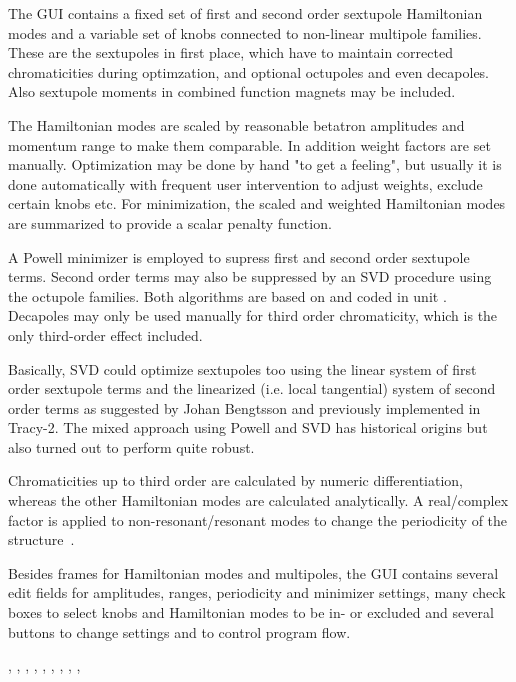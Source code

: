 \documentclass[12pt]{article}
\newcommand\code[1]{{\tt #1}}
\newcommand{\opagui}[1]{\colorbox{blue!20}{{\color{black}\code{#1}}}}
\newcommand{\ogui}[1]{\hyperref[#1]{\opagui{#1}}}
\newcommand{\opaguif}[1]{\colorbox{violet!30}{{\color{black}\code{#1}}}}
\newcommand{\oguif}[1]{\hyperref[#1]{\opaguif{#1}}}
\newcommand{\opauni}[1]{\colorbox{orange!30}{{\color{black}\code{#1}}}}
\newcommand{\ouni}[1]{\hyperref[#1]{\opauni{#1}}}
\newcommand{\uses}[1]{\flushleft {\bf Uses:} #1}
\newcommand{\desc}[1]{#1}
\newcommand{\todo}[1]{{\color{red} #1}}
\begin{document}
\desc{
The GUI contains a fixed set of first and second order sextupole Hamiltonian modes and a variable set of knobs connected to non-linear multipole families. These are the sextupoles in first place, which have to maintain corrected chromaticities during optimzation, and optional octupoles and even decapoles. Also sextupole moments in combined function magnets may be included. 

The Hamiltonian modes are scaled by reasonable  betatron amplitudes and momentum range to make them comparable. In addition weight factors are set manually. Optimization may be done by hand "to get a feeling", but usually it is done automatically with frequent user intervention to adjust weights, exclude certain knobs etc. For minimization, the scaled and weighted Hamiltonian modes are summarized to provide a scalar penalty function.

A Powell minimizer is employed to supress first and second order sextupole terms. Second order terms may also be suppressed by an SVD procedure using the octupole families. Both algorithms are based on \cite{numrec} and coded in unit \ouni{mathlib}. Decapoles may only be used manually for third order chromaticity, which is the only third-order effect included.

\todo{Basically, SVD could optimize sextupoles too using the linear system of first order sextupole terms and the linearized (i.e. local tangential) system of second order terms as suggested by Johan Bengtsson and previously implemented in Tracy-2. The mixed approach using Powell and SVD has historical origins but also turned out to perform quite robust.}

Chromaticities up to third order are calculated by numeric differentiation, whereas the other Hamiltonian modes are calculated analytically. A real/complex factor is applied to non-resonant/resonant modes to change the periodicity of the structure~\cite{inside}. 

Besides frames for Hamiltonian modes and multipoles, the GUI contains several edit fields for amplitudes, ranges, periodicity and minimizer settings, many check boxes to select knobs and Hamiltonian modes to be in- or excluded and several buttons to change settings and to control program flow.
}


\uses{
\oguif{chamframe}, \oguif{csexframe}, \ouni{chromreslib}, \ouni{chromelelib},  \ouni{chromlib}, \ogui{ochromsvector}, \ogui{opatunediag}, \ouni{globlib}, \ouni{mathlib}, \ouni{comauxlib}
}
\end{document}
